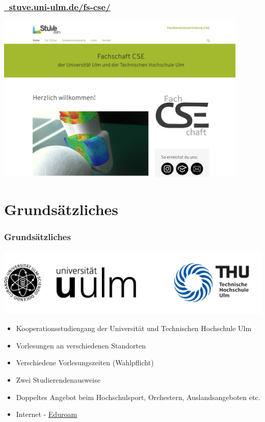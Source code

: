 \documentclass[10pt,a4paper]{beamer}
\begin{document}
    \begin{frame}
        \frametitle{ \href{https://stuve.uni-ulm.de/fs-cse/}{\Mundus~stuve.uni-ulm.de/fs-cse/}}
        \begin{center}
            \includegraphics[width=0.9\textwidth]{bilder/website.jpeg}
        \end{center}
    \end{frame}

    \section{Grundsätzliches}
    \begin{frame}
        \frametitle{Grundsätzliches}
        \vfill
        \begin{center}
            \includegraphics[width=0.7\paperwidth]{Logos.png}
        \end{center}
        \vfill
        \begin{itemize}
            \item Kooperationsstudiengang der Universität und Technischen Hochschule Ulm
            \vfill
            \item Vorlesungen an verschiedenen Standorten
            \vfill
            \item Verschiedene Vorlesungszeiten (Wahlpflicht)
            \vfill
            \item Zwei Studierendenausweise
            \vfill
            \item Doppeltes Angebot beim Hochschulsport, Orchestern, Auslandsangeboten etc.
            \item Internet - \href{https://www.uni-ulm.de/einrichtungen/kiz/service-katalog/netzwerk-konnektivitaet/wlan/eduroam/}{\color{ecs100}Eduroam} 
        \end{itemize}
        \vfill
    \end{frame}
\end{document}
